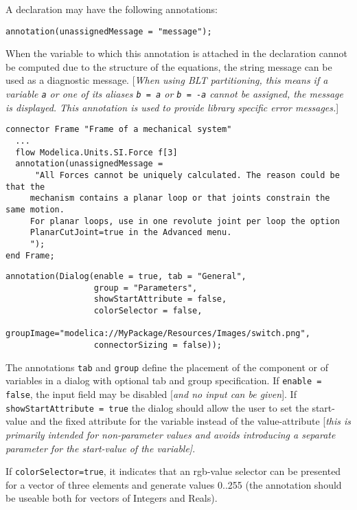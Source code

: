 A declaration may have the following annotations:
\begin{lstlisting}[language=modelica]
  annotation(unassignedMessage = "message");
\end{lstlisting}

When the variable to which this annotation is attached in the
declaration cannot be computed due to the structure of the equations,
the string message can be used as a diagnostic message. {[}\emph{When
using BLT partitioning, this means if a variable \lstinline!a! or one of its
aliases \lstinline!b = a! or \lstinline!b = -a! cannot be assigned, the message is
displayed. This annotation is used to provide library specific error
messages.}{]}

\begin{example}
\begin{lstlisting}[language=modelica]
connector Frame "Frame of a mechanical system"
  ...
  flow Modelica.Units.SI.Force f[3]
  annotation(unassignedMessage =
      "All Forces cannot be uniquely calculated. The reason could be that the
     mechanism contains a planar loop or that joints constrain the same motion.
     For planar loops, use in one revolute joint per loop the option
     PlanarCutJoint=true in the Advanced menu.
     ");
end Frame;
\end{lstlisting}
\end{example}

\begin{lstlisting}[language=modelica]
annotation(Dialog(enable = true, tab = "General",
                  group = "Parameters",
                  showStartAttribute = false,
                  colorSelector = false,
                  groupImage="modelica://MyPackage/Resources/Images/switch.png",
                  connectorSizing = false));
\end{lstlisting}

The annotations \lstinline!tab! and \lstinline!group! define the placement of
the component or of variables in a dialog with optional tab and group
specification. If \lstinline!enable = false!, the input field may
be disabled {[}\emph{and no input can be given}{]}. If
\lstinline!showStartAttribute = true! the dialog should allow the user to
set the start-value and the fixed attribute for the variable instead of
the value-attribute {[}\emph{this is primarily intended for
non-parameter values and avoids introducing a separate parameter for the
start-value of the variable{]}}.

If \lstinline!colorSelector=true!, it indicates that an rgb-value selector can be
presented for a vector of three elements and generate values 0..255 (the
annotation should be useable both for vectors of Integers and Reals).

